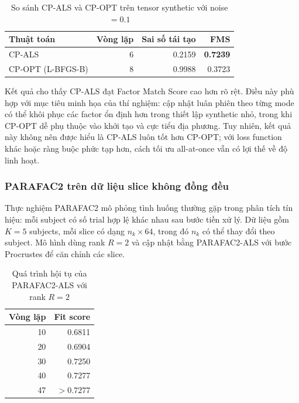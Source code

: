 \begin{table}[H]
\centering
\caption{So sánh CP-ALS và CP-OPT trên tensor synthetic với noise $=0.1$}
\label{tab:exp-dm-als-vs-opt}
\renewcommand{\arraystretch}{1.2}
\begin{tabular}{lrrr}
\toprule
\textbf{Thuật toán} & \textbf{Vòng lặp} & \textbf{Sai số tái tạo} & \textbf{FMS} \\
\midrule
CP-ALS & 6 & 0.2159 & \textbf{0.7239} \\
CP-OPT (L-BFGS-B) & 8 & 0.9988 & 0.3723 \\
\bottomrule
\end{tabular}
\end{table}

Kết quả cho thấy CP-ALS đạt Factor Match Score cao hơn rõ rệt. Điều này phù hợp
với mục tiêu minh họa của thí nghiệm: cập nhật luân phiên theo từng mode có thể
khôi phục các factor ổn định hơn trong thiết lập synthetic nhỏ, trong khi CP-OPT
dễ phụ thuộc vào khởi tạo và cực tiểu địa phương. Tuy nhiên, kết quả này không
nên được hiểu là CP-ALS luôn tốt hơn CP-OPT; với loss function khác hoặc ràng
buộc phức tạp hơn, cách tối ưu all-at-once vẫn có lợi thế về độ linh hoạt.

\subsubsection{PARAFAC2 trên dữ liệu slice không đồng đều}

Thực nghiệm PARAFAC2 mô phỏng tình huống thường gặp trong phân tích tín hiệu:
mỗi subject có số trial hợp lệ khác nhau sau bước tiền xử lý. Dữ liệu gồm $K=5$
subjects, mỗi slice có dạng $n_k \times 64$, trong đó $n_k$ có thể thay đổi theo
subject. Mô hình dùng rank $R=2$ và cập nhật bằng PARAFAC2-ALS với bước
Procrustes để căn chỉnh các slice.

\begin{table}[H]
\centering
\caption{Quá trình hội tụ của PARAFAC2-ALS với rank $R=2$}
\label{tab:exp-dm-parafac2-fit}
\renewcommand{\arraystretch}{1.2}
\begin{tabular}{rr}
\toprule
\textbf{Vòng lặp} & \textbf{Fit score} \\
\midrule
10 & 0.6811 \\
20 & 0.6904 \\
30 & 0.7250 \\
40 & 0.7277 \\
47 & $>0.7277$ \\
\bottomrule
\end{tabular}
\end{table}

